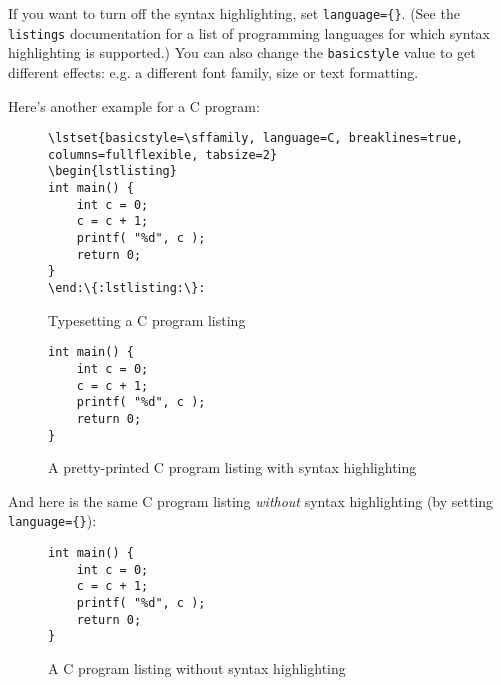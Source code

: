 If you want to turn off the syntax highlighting, set \verb|language={}|.  (See the \verb|listings| documentation for a list of programming languages for which syntax highlighting is supported.)  You can also change the \verb|basicstyle| value to get different effects: e.g. a different font family, size or text formatting.

Here's another example for a C program:

\begin{figure}[hbt!]
\begin{lstlisting}[escapechar={:}, texcl=false,language={}]
\lstset{basicstyle=\sffamily, language=C, breaklines=true, columns=fullflexible, tabsize=2}
\begin{lstlisting}
int main() {
	int c = 0;
	c = c + 1;
	printf( "%d", c );
	return 0;
}
\end:\{:lstlisting:\}:
\end{lstlisting}
\caption{Typesetting a C program listing}\label{fig:lst:c}
\end{figure}

\begin{figure}[hbt!]
\lstset{basicstyle=\sffamily, language=C, breaklines=true, columns=fullflexible, framesep=10pt, xleftmargin=.4\textwidth, tabsize=4}
\begin{lstlisting}
int main() {
	int c = 0;
	c = c + 1;
	printf( "%d", c );
	return 0;
}
\end{lstlisting}
\caption{A pretty-printed C program listing with syntax highlighting}
\end{figure}


And here is the same C program listing \emph{without} syntax highlighting (by setting \verb|language={}|):

\begin{figure}[H]

\begin{lstlisting}
int main() {
	int c = 0;
	c = c + 1;
	printf( "%d", c );
	return 0;
}
\end{lstlisting}
\caption{A C program listing without syntax highlighting}
\end{figure}
